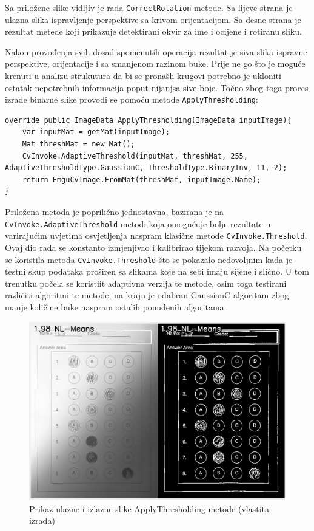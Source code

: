 \documentclass{foi}
\begin{document}
Sa priložene slike vidljiv je rada \texttt{CorrectRotation} metode. Sa lijeve strana je ulazna slika ispravljenje perspektive sa krivom orijentacijom. Sa desne strana je rezultat metede koji prikazuje detektirani okvir za ime i ocijene i rotiranu sliku.


Nakon provođenja svih dosad spomenutih operacija rezultat je siva slika ispravne perspektive, orijentacije i sa smanjenom razinom buke. Prije ne go što je moguće krenuti u analizu strukutura da bi se pronašli krugovi potrebno je ukloniti ostatak nepotrebnih informacija poput nijanjsa sive boje. Točno zbog toga proces izrade binarne slike provodi se pomoću metode \texttt{ApplyThresholding}:

\begin{lstlisting}[caption={Metoda za pretvorbu sive slike u binarnu sliku}]
override public ImageData ApplyThresholding(ImageData inputImage){
    var inputMat = getMat(inputImage);
    Mat threshMat = new Mat();
    CvInvoke.AdaptiveThreshold(inputMat, threshMat, 255, AdaptiveThresholdType.GaussianC, ThresholdType.BinaryInv, 11, 2);
    return EmguCvImage.FromMat(threshMat, inputImage.Name);
}
\end{lstlisting}

Priložena metoda je poprilično jednostavna, bazirana je na \texttt{CvInvoke.AdaptiveThreshold} metodi koja omogućuje bolje rezultate u varirajućim uvjetima osvjetljenja naspram klasične metode \texttt{CvInvoke.Threshold}. Ovaj dio rada se konstanto izmjenjivao i kalibrirao tijekom razvoja. Na početku se koristila metoda \texttt{CvInvoke.Threshold} što se pokazalo nedovoljnim kada je testni skup podataka proširen sa slikama koje na sebi imaju sijene i slično.  U tom trenutku počela se koristiit adaptivna verzija te metode, osim toga testirani različiti algoritmi te metode, na kraju je odabran GaussianC algoritam zbog manje količine buke naspram ostalih ponuđenih algoritama.

\begin{figure}[H]
\centering
\includegraphics[width=0.7\linewidth]{slike/TresholdingComparison.png}
\caption{Prikaz ulazne i izlazne slike ApplyThresholding metode (vlastita izrada)}
\end{figure}
\end{document}
